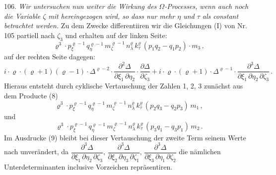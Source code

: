 \documentclass[11pt]{article}
\providecommand{\weq}[2]{\begin{equation}\tag{#1}#2\end{equation}}
\let\Delta\varDelta
\let\Omega\varOmega
\begin{document}
106. \textit{Wir untersuchen nun weiter die Wirkung des $\Omega$-Processes, wenn auch noch die Variable $\zeta$ mit hereingezogen wird, so dass nur mehr $\eta$ und $\tau$ als constant betrachtet werden.} Zu dem Zwecke differentiiren wir die Gleichungen (I) von Nr. 105 partiell nach $\zeta_3$ und erhalten auf der linken Seite:
\weq{8}{\varrho^3 \cdot p_{\xi}^{\varrho-1}\, q_{\eta}^{\varrho-1}\, m_{\zeta}^{\varrho-1}\, n_{\lambda}^{\varrho}\, k_{\tau}^{\varrho}\, (p_1 q_2 - q_1 p_2) \cdot m_3\,,}
auf der rechten Seite dagegen:
\weq{9}{i \cdot \varrho \cdot (\varrho + 1)(\varrho - 1) \cdot \Delta^{\varrho-2} \cdot \frac{\partial^2 \Delta}{\partial \xi_1\, \partial \eta_2} \cdot \frac{\partial \Delta}{\partial \zeta_3} + i \cdot \varrho \cdot (\varrho + 1) \cdot \Delta^{\varrho-1} \cdot \frac{\partial^3 \Delta}{\partial \xi_1\, \partial \eta_2\, \partial \zeta_3}\,.}
Hieraus entsteht durch cyklische Vertauschung der Zahlen 1, 2, 3 zun\"achst aus dem Producte (8)
\weq{10}{\varrho^3 \cdot p_{\xi}^{\varrho-1}\, q_{\eta}^{\varrho-1}\, m_{\zeta}^{\varrho-1}\, n_{\lambda}^{\varrho}\, k_{\tau}^{\varrho}\, (p_2 q_3 - q_2 p_3)\, m_1\,,}
und
\weq{11}{\varrho^3 \cdot p_{\xi}^{\varrho-1}\, q_{\eta}^{\varrho-1}\, m_{\zeta}^{\varrho-1}\, n_{\lambda}^{\varrho}\, k_{\tau}^{\varrho}\, (p_3 q_1 - q_3 p_1)\, m_2\,.}
Im Ausdrucke (9) bleibt bei dieser Vertauschung der zweite Term seinem Werte nach unver\"andert, da $\dfrac{\partial^3 \Delta}{\partial \xi_1\, \partial \eta_2\, \partial \zeta_3}$, $\dfrac{\partial^3 \Delta}{\partial \xi_2\, \partial \eta_3\, \partial \zeta_1}$, $\dfrac{\partial^3 \Delta}{\partial \xi_3\, \partial \eta_1\, \partial \zeta_2}$ die n\"amlichen Unterdeterminanten inclusive Vorzeichen repr\"asentiren.
\end{document}
